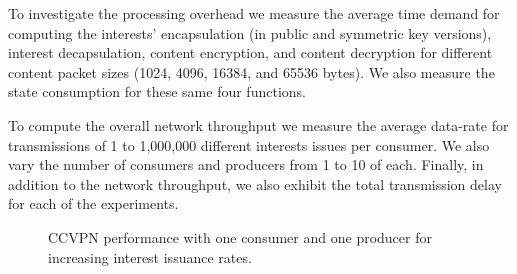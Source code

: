 To investigate the processing overhead we measure the average time demand for computing the interests' encapsulation (in public and symmetric key versions), interest decapsulation, content encryption, and content decryption for different content packet sizes (1024, 4096, 16384, and 65536 bytes). We also measure the state consumption for these same four functions.

To compute the overall network throughput we measure the average data-rate for transmissions of 1 to 1,000,000 different interests issues per consumer. We also vary the number of consumers and producers from 1 to 10 of each. Finally, in addition to the network throughput, we also exhibit the total transmission delay for each of the experiments.


\begin{figure}[]
\centering
  \hfil
\caption{CCVPN performance with one consumer and one producer for increasing interest issuance rates.}\label{exp1}
\end{figure}


